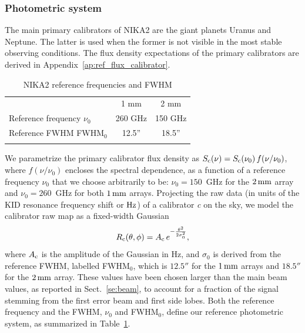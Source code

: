 \subsubsection{Photometric system}
\label{se:photometric_system}

The main primary calibrators of NIKA2 are the giant planets Uranus and
Neptune. The latter is used when the former is not visible in the most
stable observing conditions. The flux density expectations of the
primary calibrators are derived in Appendix~\ref{ap:ref_flux_calibrator}. 
%
\begin{table}[!htbp]
\caption{NIKA2 reference frequencies and FWHM}
\label{tab:definitions}
\centering     
\begin{tabular}{lcc}
\hline\hline
      \noalign{\smallskip}
      & 1 mm & 2 mm \\
      \noalign{\smallskip}
      \hline
      \noalign{\smallskip}
      Reference frequency $\nu_{0}$ & 260 GHz & 150 GHz \\
      Reference FWHM  FWHM$_{0}$    & 12.5'' & 18.5'' \\
      \noalign{\smallskip}
      \hline
\end{tabular}
\end{table}

We parametrize the primary calibrator flux density as 
$S_{\rm{c}}(\nu) = S_{\rm{c}}(\nu_0)\, f(\nu/\nu_{0})$, where $f(\nu/\nu_{0})$
encloses the spectral dependence, 
as a function of a reference frequency $\nu_{0}$ that we choose
arbitrarily to be: $\nu_{0} = 150$~GHz for the $2\,\rm{mm}$ array and
$\nu_{0}= 260$~GHz for both $1\,\rm{mm}$ arrays. Projecting the raw
data (in units of the KID resonance frequency shift or $\rm Hz$) of a
calibrator {\sl c} on the sky, we model the calibrator raw map as a
fixed-width Gaussian
\begin{equation}
  R_{\rm{c}}(\theta, \phi)  = A_{\rm{c}} \, e^{-\frac{\theta^{2}}{2\sigma_{0}^{2}}},
  \label{eq:gaussian_amplitude}
\end{equation}
{\lp where $A_{\rm{c}}$ is the amplitude of the 
Gaussian in Hz,} and $\sigma_{0}$ is derived from the
reference FWHM, labelled FWHM$_{0}$, which is $12.5''$ for the $1\, \rm{mm}$
arrays and $18.5''$ for the $2\,\rm{mm}$ array. These values have
been chosen larger than the main beam values, as reported in
Sect.~\ref{se:beam}, to account for a fraction of the signal stemming from
the first error beam and first side lobes.
Both the reference frequency and the FWHM, $\nu_0$ and FWHM$_{0}$, define
our reference photometric system, as summarized in Table~\ref{tab:definitions}.

